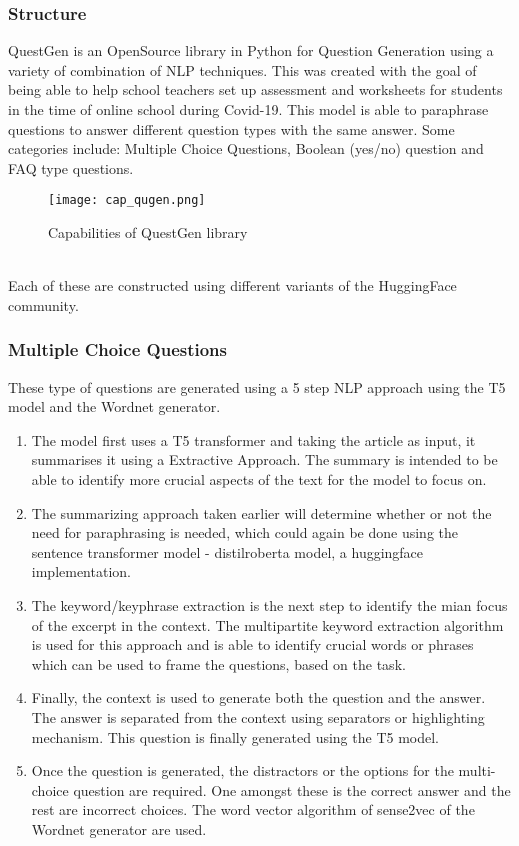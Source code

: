 \documentclass[oneside,a4paper]{article}
\begin{document}
\subsubsection{Structure}
QuestGen is an OpenSource library in Python for Question Generation using a variety of combination of NLP techniques. This was created with the goal of being able to help school teachers set up assessment and worksheets for students in the time of online school during Covid-19. This model is able to paraphrase questions to answer different question types with the same answer. Some categories include: Multiple Choice Questions, Boolean (yes/no) question and FAQ type questions.
\begin{figure}[H]
    \centering
    \texttt{[image: cap\_qugen.png]}
    \caption{Capabilities of QuestGen library}
    \label{capabilities_qugen}
\end{figure}
\\
Each of these are constructed using different variants of the HuggingFace community.
\subsubsection{Multiple Choice Questions}
These type of questions are generated using a 5 step NLP approach using the T5 model and the Wordnet generator. 
\\
\begin{enumerate}
  \item The model first uses a T5 transformer and taking the article as input, it summarises it using a Extractive Approach. The summary is intended to be able to identify more crucial aspects of the text for the model to focus on. 
  \item The summarizing approach taken earlier will determine whether or not the need for paraphrasing is needed, which could again be done using the sentence transformer model - distilroberta model, a huggingface implementation.
  \item The keyword/keyphrase extraction is the next step to identify the mian focus of the excerpt in the context. The multipartite keyword extraction algorithm is used for this approach and is able to identify crucial words or phrases which can be used to frame the questions, based on the task.
  \item Finally, the context is used to generate both the question and the answer. The answer is separated from the context using separators or highlighting mechanism. This question is finally generated using the T5 model.
  \item Once the question is generated, the distractors or the options for the multi-choice question are required. One amongst these is the correct answer and the rest are incorrect choices. The word vector algorithm of sense2vec of the Wordnet generator are used.
\end{enumerate}
\end{document}
